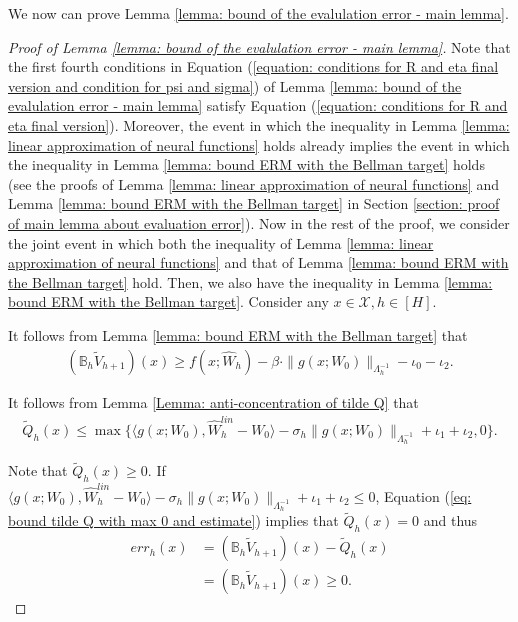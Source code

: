 \documentclass{article} \usepackage{iclr2023/iclr2023_conference,times}
\begin{document}
We now can prove Lemma \ref{lemma: bound of the evalulation error - main lemma}. 
\begin{proof}[Proof of Lemma \ref{lemma: bound of the evalulation error - main lemma}]
Note that the first fourth conditions in Equation (\ref{equation: conditions for R and eta final version and condition for psi and sigma}) of Lemma \ref{lemma: bound of the evalulation error - main lemma} satisfy Equation (\ref{equation: conditions for R and eta final version}). Moreover, the event in which the inequality in Lemma \ref{lemma: linear approximation of neural functions} holds already implies the event in which the inequality in Lemma \ref{lemma: bound ERM with the Bellman target} holds (see the proofs of Lemma \ref{lemma: linear approximation of neural functions} and Lemma \ref{lemma: bound ERM with the Bellman target} in Section \ref{section: proof of main lemma about evaluation error}). Now in the rest of the proof, we consider the joint event in which both the inequality of Lemma \ref{lemma: linear approximation of neural functions} and that of Lemma \ref{lemma: bound ERM with the Bellman target} hold. Then, we also have the inequality in Lemma \ref{lemma: bound ERM with the Bellman target}. Consider any $x \in \mathcal{X}, h \in [H]$. 



It follows from Lemma \ref{lemma: bound ERM with the Bellman target} that
\begin{align}
     (\mathbb{B}_h \tilde{V}_{h+1})(x) \geq  f(x; \hat{W}_h) - \beta  \cdot \| g(x; W_0) \|_{\Lambda_h^{-1}} - \iota_0 - \iota_2.
     \label{eq: lower bound bellman op}
\end{align}

It follows from Lemma \ref{Lemma: anti-concentration of tilde Q} that 
\begin{align}
   \tilde{Q}_h(x) \leq \max\{\langle g(x; W_0), \hat{W}_h^{lin} - W_0 \rangle  -\sigma_h \| g(x; W_0) \|_{\Lambda_h^{-1}} + \iota_1 + \iota_2, 0\}.
\label{eq: bound tilde Q with max 0 and estimate}
\end{align}

Note that $\tilde{Q}_h(x) \geq 0$. If $\langle g(x; W_0), \hat{W}_h^{lin} - W_0 \rangle  -\sigma_h \| g(x; W_0) \|_{\Lambda_h^{-1}} + \iota_1 + \iota_2 \leq 0$, Equation (\ref{eq: bound tilde Q with max 0 and estimate}) implies that $\tilde{Q}_h(x) = 0$ and thus 
\begin{align*}
    err_h(x) &= (\mathbb{B}_h \tilde{V}_{h+1})(x) -\tilde{Q}_h(x) \\ 
    &= (\mathbb{B}_h \tilde{V}_{h+1})(x) \geq 0. 
\end{align*}


\end{proof}
\end{document}
